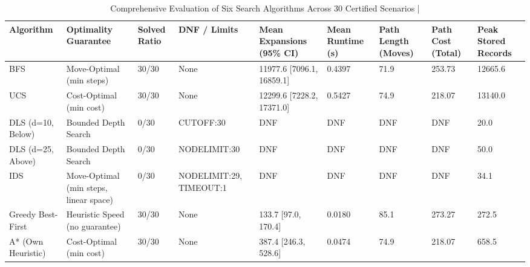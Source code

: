 \begin{table}[htbp]
\centering
\caption{Comprehensive Evaluation of Six Search Algorithms Across 30 Certified Scenarios | \stampline}
\label{tab:partB_six_algorithms}
\begin{tabular}{lllllllll}
\toprule
Algorithm & Optimality Guarantee & Solved Ratio & DNF / Limits & Mean Expansions (95\% CI) & Mean Runtime (s) & Path Length (Moves) & Path Cost (Total) & Peak Stored Records \\
\midrule
BFS & Move-Optimal (min steps) & 30/30 & None & 11977.6 [7096.1, 16859.1] & 0.4397 & 71.9 & 253.73 & 12665.6 \\
UCS & Cost-Optimal (min cost) & 30/30 & None & 12299.6 [7228.2, 17371.0] & 0.5427 & 74.9 & 218.07 & 13140.0 \\
DLS (d=10, Below) & Bounded Depth Search & 0/30 & CUTOFF:30 & DNF & DNF & DNF & DNF & 20.0 \\
DLS (d=25, Above) & Bounded Depth Search & 0/30 & NODELIMIT:30 & DNF & DNF & DNF & DNF & 50.0 \\
IDS & Move-Optimal (min steps, linear space) & 0/30 & NODELIMIT:29, TIMEOUT:1 & DNF & DNF & DNF & DNF & 34.1 \\
Greedy Best-First & Heuristic Speed (no guarantee) & 30/30 & None & 133.7 [97.0, 170.4] & 0.0180 & 85.1 & 273.27 & 272.5 \\
A* (Own Heuristic) & Cost-Optimal (min cost) & 30/30 & None & 387.4 [246.3, 528.6] & 0.0474 & 74.9 & 218.07 & 658.5 \\
\bottomrule
\end{tabular}

\end{table}
